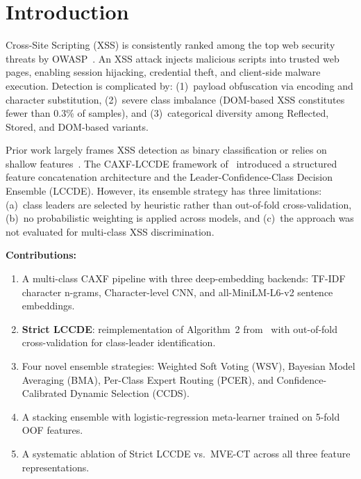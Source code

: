 \documentclass[conference]{IEEEtran}
\begin{document}
\section{Introduction}
\label{sec:intro}

Cross-Site Scripting (XSS) is consistently ranked among the top web
security threats by OWASP~\cite{owasp2021}. An XSS attack injects malicious
scripts into trusted web pages, enabling session hijacking, credential theft,
and client-side malware execution. Detection is complicated by: (1)~payload
obfuscation via encoding and character substitution, (2)~severe class
imbalance (DOM-based XSS constitutes fewer than 0.3\% of samples), and
(3)~categorical diversity among Reflected, Stored, and DOM-based variants.

Prior work largely frames XSS detection as binary classification or relies on
shallow features~\cite{caxf_lccde2024}. The CAXF-LCCDE framework
of~\cite{caxf_lccde2024} introduced a structured feature concatenation
architecture and the Leader-Confidence-Class Decision Ensemble (LCCDE).
However, its ensemble strategy has three limitations: (a)~class leaders are
selected by heuristic rather than out-of-fold cross-validation,
(b)~no probabilistic weighting is applied across models, and (c)~the approach
was not evaluated for multi-class XSS discrimination.

\textbf{Contributions:}
\begin{enumerate}
  \item A multi-class CAXF pipeline with three deep-embedding backends:
        TF-IDF character n-grams, Character-level CNN, and all-MiniLM-L6-v2
        sentence embeddings.
  \item \textbf{Strict LCCDE}: reimplementation of Algorithm~2
        from~\cite{caxf_lccde2024} with out-of-fold cross-validation for
        class-leader identification.
  \item Four novel ensemble strategies: Weighted Soft Voting (WSV),
        Bayesian Model Averaging (BMA), Per-Class Expert Routing (PCER),
        and Confidence-Calibrated Dynamic Selection (CCDS).
  \item A stacking ensemble with logistic-regression meta-learner trained on
        5-fold OOF features.
  \item A systematic ablation of Strict LCCDE vs.\ MVE-CT across all three
        feature representations.
\end{enumerate}
\end{document}
